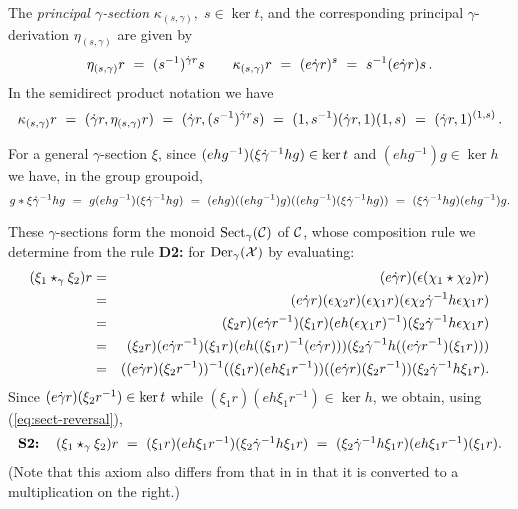 \medskip
The \emph{principal $\gamma$-section} $\kappa_{(s,\gamma)}, \; s \in \ker t$, 
  
and the corresponding principal $\gamma$-derivation $\eta_{(s,\gamma)}$
are given by
$$
\eta_{(s,\gamma)} r ~=~ (s^{-1})^{\dot{\gamma} r} s \quad\quad
\kappa_{(s,\gamma)} r ~=~ (e \dot{\gamma} r)^s ~=~ s^{-1}(e \dot{\gamma} r)s\,.
$$
In the semidirect product notation we have 
$$
\kappa_{(s,\gamma)} r ~=~ (\dot{\gamma} r,\eta_{(s,\gamma)} r) ~=~ (\dot{\gamma} r,(s^{-1})^{\dot{\gamma} r} s) ~=~
(1,s^{-1})(\dot{\gamma} r,1)(1,s) ~=~ (\dot{\gamma} r,1)^{(1,s)}\,.
$$

\noindent 
For a general $\gamma$-section $\xi$, 
since $(ehg^{-1})(\xi \dot{\gamma}^{-1} hg) \in \ker t$ and $(ehg^{-1})g \in \ker h$ 
we have, in the group groupoid, 
\begin{equation} \label{eq:sect-reversal}
g * \xi \dot{\gamma}^{-1} hg ~=~
g(ehg^{-1})(\xi \dot{\gamma}^{-1} hg) ~=~
(ehg)((ehg^{-1})g)((ehg^{-1})(\xi \dot{\gamma}^{-1} hg)) ~=~
(\xi \dot{\gamma}^{-1} hg)(ehg^{-1})g.
\end{equation}

\noindent
These $\gamma$-sections form the monoid  $\rm{Sect}_{\gamma}(\mathcal{C})$  of  $\mathcal{C}$,
whose composition rule we determine from the rule  
\textbf{D2:}  for  $\mathrm{Der}_{\gamma}(\mathcal{X})$  by evaluating:
\begin{eqnarray*}
(\xi_1 \star_{\gamma} \xi_2)r
 & = & (e \dot{\gamma} r)(\epsilon (\chi_1 \star \chi_2) r) \\
 & = & (e \dot{\gamma} r)(\epsilon \chi_2 r)(\epsilon \chi_1 r)
           (\epsilon \chi_2 \dot{\gamma}^{-1} h \epsilon \chi_1 r) \\
 & = & (\xi_2 r)(e \dot{\gamma} r^{-1})(\xi_1 r)(eh(\epsilon \chi_1 r)^{-1})
        (\xi_2 \dot{\gamma}^{-1} h \epsilon \chi_1 r) \\
 & = & (\xi_2 r)(e \dot{\gamma} r^{-1})(\xi_1 r)(eh((\xi_1 r)^{-1}(e \dot{\gamma} r)))
        (\xi_2 \dot{\gamma}^{-1} h ((e \dot{\gamma} r^{-1})(\xi_1 r))) \\
 & = & ((e \dot{\gamma} r)(\xi_2 r^{-1}))^{-1} ((\xi_1 r)(e h \xi_1 r^{-1}))
        ((e \dot{\gamma} r)(\xi_2 r^{-1})) (\xi_2 \dot{\gamma}^{-1} h \xi_1 r).
\end{eqnarray*}
Since  
$(e \dot{\gamma} r)(\xi_2 r^{-1}) \in \ker t$
while  $(\xi_1 r)(e h \xi_1 r^{-1}) \in \ker h$,
we obtain, using (\ref{eq:sect-reversal}),
\begin{equation} \label{eq:section-comp}
\begin{tabular}{l l}
\textbf{S2:}  &  $(\xi_1 \star_{\gamma} \xi_2)r
 ~=~ (\xi_1 r)(e h \xi_1 r^{-1})(\xi_2 \dg^{-1} h \xi_1 r)
 ~=~ (\xi_2 \dg^{-1} h \xi_1 r)(eh \xi_1 r^{-1})(\xi_1 r)$.
\end{tabular}
\end{equation}
(Note that this axiom also differs from that in \cite{alp:wens-ijac}
in that it is converted to a multiplication on the right.) 

